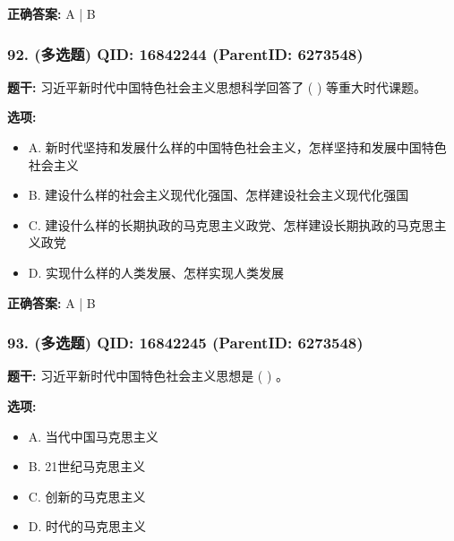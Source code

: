 \documentclass[12pt,UTF8]{ctexart}
\begin{document}
\textbf{正确答案:}
A | B

\vspace{0.3em}\hrulefill\vspace{0.7em}

\subsubsection*{92. (多选题) \small QID: 16842244 (ParentID: 6273548)}

\textbf{题干:}
习近平新时代中国特色社会主义思想科学回答了 ( ) 等重大时代课题。



\textbf{选项:}
\begin{itemize}[leftmargin=*]

  \item A. 新时代坚持和发展什么样的中国特色社会主义，怎样坚持和发展中国特色社会主义

  \item B. 建设什么样的社会主义现代化强国、怎样建设社会主义现代化强国

  \item C. 建设什么样的长期执政的马克思主义政党、怎样建设长期执政的马克思主义政党

  \item D. 实现什么样的人类发展、怎样实现人类发展

\end{itemize}

\textbf{正确答案:}
A | B

\vspace{0.3em}\hrulefill\vspace{0.7em}

\subsubsection*{93. (多选题) \small QID: 16842245 (ParentID: 6273548)}

\textbf{题干:}
习近平新时代中国特色社会主义思想是 ( ) 。



\textbf{选项:}
\begin{itemize}[leftmargin=*]

  \item A. 当代中国马克思主义

  \item B. 21世纪马克思主义

  \item C. 创新的马克思主义

  \item D. 时代的马克思主义

\end{itemize}
\end{document}
